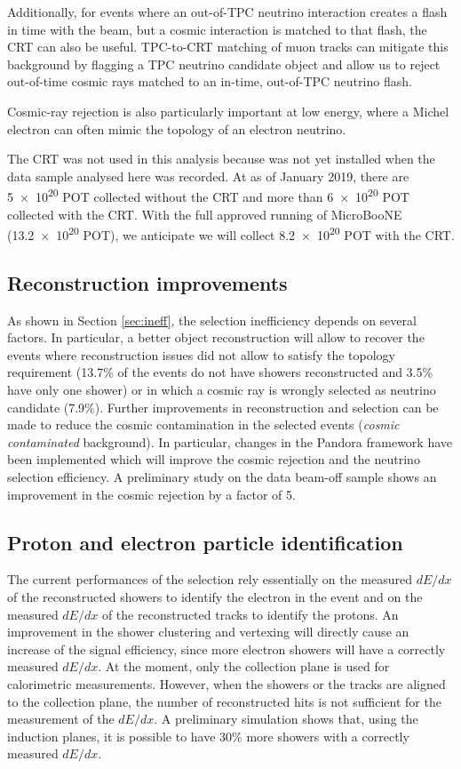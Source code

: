 Additionally, for events where an out-of-TPC neutrino interaction creates a flash in time with the beam, but a cosmic interaction is matched to that flash, the CRT can also be useful.  TPC-to-CRT matching of muon tracks can mitigate this background by flagging a TPC neutrino candidate object and allow us to reject out-of-time cosmic rays matched to an in-time, out-of-TPC neutrino flash.

Cosmic-ray rejection is also particularly important at low energy, where a Michel electron can often mimic the topology of an electron neutrino. 

The CRT was not used in this analysis because was not yet installed when the data sample analysed here was recorded. At as of January 2019, there are \num{5e20} POT collected without the CRT and more than \num{6e20} POT collected with the CRT. With the full approved running of MicroBooNE (\num{13.2e20} POT), we anticipate we will collect \num{8.2e20} POT with the CRT.

\subsection*{Reconstruction improvements}
As shown in Section \ref{sec:ineff}, the selection inefficiency depends on several factors. In particular, a better object reconstruction will allow to recover the events where reconstruction issues did not allow to satisfy the topology requirement (13.7\% of the events do not have showers reconstructed and 3.5\% have only one shower) or in which a cosmic ray is wrongly selected as neutrino candidate (7.9\%). 
Further improvements in reconstruction and selection can be made to reduce the cosmic contamination in the selected events (\emph{cosmic contaminated} background).
In particular, changes in the Pandora framework have been implemented which will improve the cosmic rejection and the neutrino selection efficiency. A preliminary study on the data beam-off sample shows an improvement in the cosmic rejection by a factor of 5.

\subsection*{Proton and electron particle identification}
The current performances of the selection rely essentially on the measured $dE/dx$ of the reconstructed showers to identify the electron in the event and on the measured $dE/dx$ of the reconstructed tracks to identify the protons. An improvement in the shower clustering and vertexing will directly cause an increase of the signal efficiency, since more electron showers will have a correctly measured $dE/dx$. 
At the moment, only the collection plane is used for calorimetric measurements. However, when the showers or the tracks are aligned to the collection plane, the number of reconstructed hits is not sufficient for the measurement of the $dE/dx$. A preliminary simulation shows that, using the induction planes, it is possible to have 30\% more showers with a correctly measured $dE/dx$.

